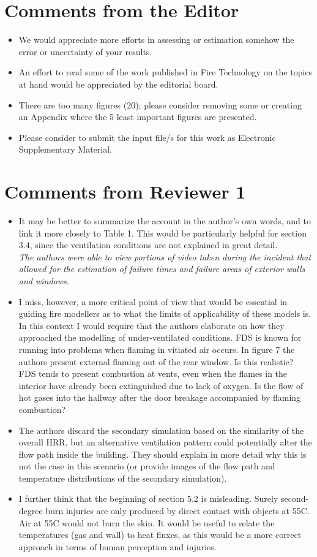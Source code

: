 \documentclass[12pt]{article}
\begin{document}
\section{Comments from the Editor}
\begin{itemize}
\item We would appreciate more efforts in assessing or estimation somehow the error or uncertainty of your results.
\item An effort to read some of the work published in Fire Technology on the topics at hand would be appreciated by the editorial board.
\item There are too many figures (20); please consider removing some or creating an Appendix where the 5 least important figures are presented.
\item Please consider to submit the input file/s for this work as Electronic Supplementary Material.
\end{itemize}

\section{Comments from Reviewer 1}
\begin{itemize}
\item It may be better to summarize the account in the author's own words, and to link it more closely to Table 1. This would be particularly helpful for section 3.4, since the ventilation conditions are not explained in great detail. \\
{\it The authors were able to view portions of video taken during the incident that allowed for the estimation of failure times and failure areas of exterior walls and windows.}
\item I miss, however, a more critical point of view that would be essential in guiding fire modellers as to what the limits of applicability of these models is. In this context I would require that the authors elaborate on how they approached the modelling of under-ventilated conditions. FDS is known for running into problems when flaming in vitiated air occurs. In figure 7 the authors present external flaming out of the rear window. Is this realistic? FDS tends to present combustion at vents, even when the flames in the interior have already been extinguished due to lack of oxygen. Is the flow of hot gases into the hallway after the door breakage accompanied by flaming combustion?
\item The authors discard the secondary simulation based on the similarity of the overall HRR, but an alternative ventilation pattern could potentially alter the flow path inside the building. They should explain in more detail why this is not the case in this scenario (or provide images of the flow path and temperature distributions of the secondary simulation).
\item I further think that the beginning of section 5.2 is misleading. Surely second-degree burn injuries are only produced by direct contact with objects at 55C. Air at 55C would not burn the skin. It would be useful to relate the temperatures (gas and wall) to heat fluxes, as this would be a more correct approach in terms of human perception and injuries.
\end{itemize}
\end{document}
